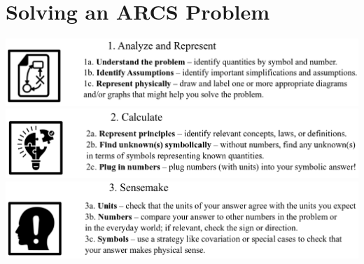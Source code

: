 \documentclass[]{article}
\begin{document}
\begin{PresentSpace}
\begin{multicols}{2}
\begin{center}
\end{center}
\end{multicols}
\section*{Solving an ARCS Problem}
\begin{center}
	\includegraphics[scale=0.4]{AnalyzeAndRepresent}
	\includegraphics[scale=0.4]{Calculate}
	\includegraphics[scale=0.4]{Sensemake}
\end{center}

\end{PresentSpace}
\newpage
\end{document}
